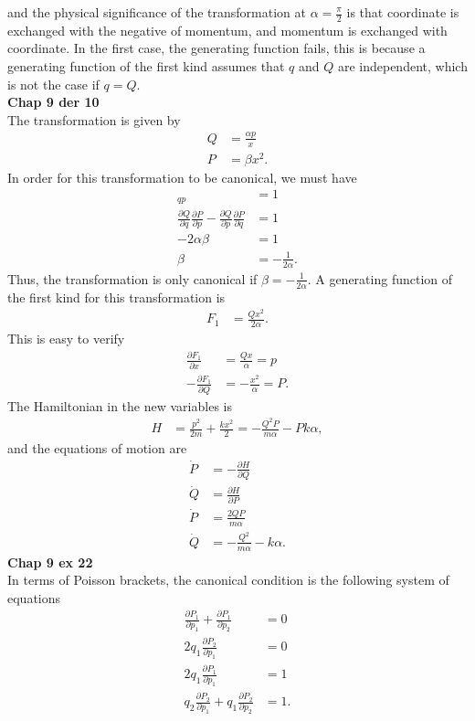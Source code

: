 \documentclass[10pt]{article}
\begin{document}
and the physical significance of the transformation at $\alpha=\frac{\pi}{2}$ is that coordinate
is exchanged with the negative of momentum, and momentum is exchanged with coordinate.  In the
first case, the generating function fails, this is because a generating function of the first 
kind assumes that $q$ and $Q$ are independent, which is not the case if $q=Q$.\\
\textbf{Chap 9 der 10}\\
The transformation is given by
\begin{align*}
  Q &= \frac{\alpha p}{x}\\
  P &= \beta x^2.
\end{align*}
In order for this transformation to be canonical, we must have
\begin{align*}
  [Q,P]_{qp} &= 1\\
  \frac{\partial Q}{\partial q}\frac{\partial P}{\partial p} - \frac{\partial Q}{\partial p}\frac{\partial P}{\partial q} &= 1\\
  -2\alpha\beta &= 1\\
  \beta &= -\frac{1}{2\alpha}.
\end{align*}
Thus, the transformation is only canonical if $\beta = -\frac{1}{2\alpha}$.  A generating function of the first
kind for this transformation is
\begin{align*}
  F_1 &= \frac{Qx^2}{2\alpha}.
\end{align*}
This is easy to verify
\begin{align*}
  \frac{\partial F_1}{\partial x} &= \frac{Qx}{\alpha} = p\\
  -\frac{\partial F_1}{\partial Q} &= -\frac{x^2}{\alpha} = P.
\end{align*}
The Hamiltonian in the new variables is
\begin{align*}
  H &= \frac{p^2}{2m}+\frac{kx^2}{2}=-\frac{Q^2P}{m\alpha}-Pk\alpha,
\end{align*}
and the equations of motion are
\begin{align*}
  \dot{P} &= -\frac{\partial H}{\partial Q}\\
  \dot{Q} &= \frac{\partial H}{\partial P}\\
  \dot{P} &= \frac{2QP}{m\alpha}\\
  \dot{Q} &= -\frac{Q^2}{m\alpha}-k\alpha.
\end{align*}
\textbf{Chap 9 ex 22}\\
In terms of Poisson brackets, the canonical condition is the following system 
of equations
\begin{align*}
  \frac{\partial P_1}{\partial p_1} + \frac{\partial P_1}{\partial p_2} &= 0\\
  2q_1\frac{\partial P_2}{\partial p_1} &= 0\\
  2q_1\frac{\partial P_1}{\partial p_1} &= 1\\
  q_2\frac{\partial P_2}{\partial p_1} + q_1\frac{\partial P_2}{\partial p_2} &= 1.
\end{align*}
\end{document}
